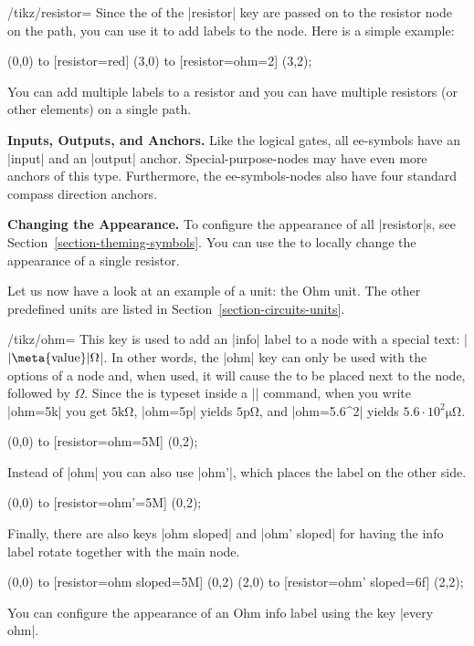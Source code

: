 \begin{key}{/tikz/resistor=}
    Since the  of the |resistor| key are passed on to the
    resistor node on the path, you can use it to add labels to the node. Here
    is a simple example:
\begin{codeexample}[]
  \draw (0,0) to [resistor=red]        (3,0)
              to [resistor={ohm=2\mu}] (3,2);
\end{codeexample}

    You can add multiple labels to a resistor and you can have multiple
    resistors (or other elements) on a single path.

    \medskip\textbf{Inputs, Outputs, and Anchors.}
    Like the logical gates, all ee-symbols have an |input| and an |output|
    anchor. Special-purpose-nodes may have even more anchors of this type.
    Furthermore, the ee-symbols-nodes also have four standard compass direction
    anchors.

    \medskip\textbf{Changing the Appearance.}
    To configure the appearance of all |resistor|s, see
    Section~\ref{section-theming-symbols}. You can use the  to
    locally change the appearance of a single resistor.
\end{key}

Let us now have a look at an example of a unit: the Ohm unit. The other
predefined units are listed in Section~\ref{section-circuits-units}.

\begin{key}{/tikz/ohm=}
    This key is used to add an |info| label to a node with a special text:
    |$\mathrm{|\meta{value}|\Omega}$|. In other words, the |ohm| key can only
    be used with the options of a node and, when used, it will cause the
     to be placed next to the node, followed by $\Omega$. Since the
     is typeset inside a |\mathrm| command, when you write |ohm=5k|
    you get $\mathrm{5k\Omega}$, |ohm=5p| yields $\mathrm{5p\Omega}$, and
    |ohm=5.6^{2}\mu| yields $\mathrm{5.6\cdot 10^{2}\mu\Omega}$.
\begin{codeexample}[]
 \draw (0,0) to [resistor={ohm=5M}] (0,2);
\end{codeexample}

    Instead of |ohm| you can also use |ohm'|, which places the label on the
    other side.
\begin{codeexample}[]
 \draw (0,0) to [resistor={ohm'=5M}] (0,2);
\end{codeexample}

    Finally, there are also keys |ohm sloped| and |ohm' sloped| for having the
    info label rotate together with the main node.
\begin{codeexample}[]
  \draw (0,0) to [resistor={ohm sloped=5M}] (0,2)
        (2,0) to [resistor={ohm' sloped=6f}]  (2,2);
\end{codeexample}

    You can configure the appearance of an Ohm info label using the key
    |every ohm|.
\end{key}

